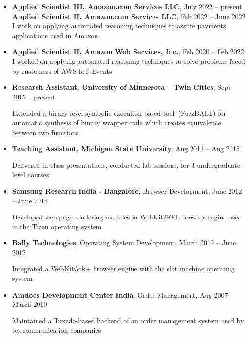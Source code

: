 \documentclass[letterpaper,10pt]{article}
\begin{document}
\begin{itemize}
  \item
    \textbf{Applied Scientist III, Amazon.com Services LLC}, July 2022 -- present \\
    \textbf{Applied Scientist II, Amazon.com Services LLC}, Feb 2022 -- June 2022
    I work on applying automated reasoning techniques to assure
    payments applications used in Amazon.

  \item
    \textbf{Applied Scientist II, Amazon Web Services, Inc.}, Feb 2020 -- Feb 2022
    I worked on applying automated reasoning techniques to solve
    problems faced by customers of AWS IoT Events. 
\item 
\textbf{Research Assistant, University of Minnesota -- Twin Cities}, Sept 2015 -- present 

Extended a binary-level symbolic execution-based tool~(FuzzBALL) for automatic synthesis of binary wrapper code which creates equivalence between two functions 
%
\item
\textbf{Teaching Assistant, Michigan State University}, Aug 2013 -- Aug 2015

Delivered in-class presentations, conducted lab sessions, for 3 undergraduate-level courses%

\item
\textbf{Samsung Research India - Bangalore}, Browser Development, June 2012 -- June 2013

Developed web page rendering modules in WebKit2EFL browser engine used in the Tizen operating system

\item
\textbf{Bally Technologies}, Operating System Development, March 2010 -- June 2012

Integrated a WebKitGtk+ browser engine with the slot machine operating system


\item
\textbf{Amdocs Development Center India}, Order Management, Aug 2007 -- March 2010

Maintained a Tuxedo-based backend of an order management system used by telecommunication companies


\end{itemize}
\end{document}
